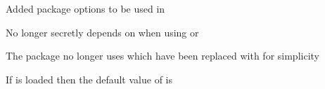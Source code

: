 \begin{changelog}
\begin{change}[version = 1.1, date = 2021-06-03, beta = false]
			\item Added package options to be used in 
			\item No longer secretly depends on  when using \xetex{} or \luatex
			\item The package no longer uses  which have been replaced with  for simplicity
			\item If  is loaded then the default value of  is 
		\end{change}
	\end{changelog}
	
